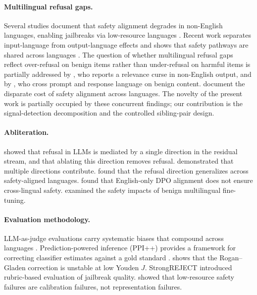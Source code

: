 \documentclass[11pt,letterpaper]{article}
\begin{document}
\paragraph{Multilingual refusal gaps.}
Several studies document that safety alignment degrades in non-English languages, enabling jailbreaks via low-resource languages \citep{Yong2023, Deng2023, Shen2024, Wang2023}.
Recent work separates input-language from output-language effects \citep{Marchisio2024, Zhang2026} and shows that safety pathways are shared across languages \citep{Miao2026, Upadhyaya2026, Wang2025}.
The question of whether multilingual refusal gaps reflect over-refusal on benign items rather than under-refusal on harmful items is partially addressed by \citet{Addagada2026}, who reports a relevance curse in non-English output, and by \citet{Nguyen2026}, who cross prompt and response language on benign content.
\citet{Yoon2026} document the disparate cost of safety alignment across languages.
The novelty of the present work is partially occupied by these concurrent findings; our contribution is the signal-detection decomposition and the controlled sibling-pair design.

\paragraph{Abliteration.}
\citet{Arditi2024} showed that refusal in LLMs is mediated by a single direction in the residual stream, and that ablating this direction removes refusal.
\citet{Joad2026} demonstrated that multiple directions contribute.
\citet{Wang2025} found that the refusal direction generalizes across safety-aligned languages.
\citet{Krasnodebska2026} found that English-only DPO alignment does not ensure cross-lingual safety.
\citet{Hawkins2026} examined the safety impacts of benign multilingual fine-tuning.

\paragraph{Evaluation methodology.}
LLM-as-judge evaluations carry systematic biases that compound across languages \citep{Lee2025}.
Prediction-powered inference (PPI++) provides a framework for correcting classifier estimates against a gold standard \citep{Angelopoulos2023}.
\citet{Fiedler2026} shows that the Rogan--Gladen correction is unstable at low Youden $J$.
StrongREJECT \citep{Souly2024} introduced rubric-based evaluation of jailbreak quality.
\citet{Aziz2026} showed that low-resource safety failures are calibration failures, not representation failures.
\end{document}
